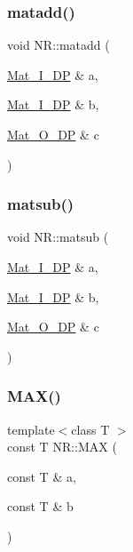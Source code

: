 \mbox{\label{namespaceNR_a3e83e821eb8a08def3eb745893d705f0}} 
\subsubsection{\texorpdfstring{matadd()}{matadd()}}
{\footnotesize\ttfamily void N\+R\+::matadd (\begin{DoxyParamCaption}\item[{\mbox{\hyperlink{namespaceNR_a2b8abfda8fffad6ba0a1b5a4c0773dbf}{Mat\+\_\+\+I\+\_\+\+DP}} \&}]{a,  }\item[{\mbox{\hyperlink{namespaceNR_a2b8abfda8fffad6ba0a1b5a4c0773dbf}{Mat\+\_\+\+I\+\_\+\+DP}} \&}]{b,  }\item[{\mbox{\hyperlink{namespaceNR_adc1f8da33094b6bbeb1f5f899515ce54}{Mat\+\_\+\+O\+\_\+\+DP}} \&}]{c }\end{DoxyParamCaption})}

\mbox{\label{namespaceNR_a3813813f04cdd8f245c3aa44ff4f445d}} 
\subsubsection{\texorpdfstring{matsub()}{matsub()}}
{\footnotesize\ttfamily void N\+R\+::matsub (\begin{DoxyParamCaption}\item[{\mbox{\hyperlink{namespaceNR_a2b8abfda8fffad6ba0a1b5a4c0773dbf}{Mat\+\_\+\+I\+\_\+\+DP}} \&}]{a,  }\item[{\mbox{\hyperlink{namespaceNR_a2b8abfda8fffad6ba0a1b5a4c0773dbf}{Mat\+\_\+\+I\+\_\+\+DP}} \&}]{b,  }\item[{\mbox{\hyperlink{namespaceNR_adc1f8da33094b6bbeb1f5f899515ce54}{Mat\+\_\+\+O\+\_\+\+DP}} \&}]{c }\end{DoxyParamCaption})}

\mbox{\label{namespaceNR_a92c68d40de4a9647ae9f24ec57c53b0e}} 
\subsubsection{\texorpdfstring{MAX()}{MAX()}\hspace{0.1cm}{\footnotesize\ttfamily [1/3]}}
{\footnotesize\ttfamily template$<$class T $>$ \\
const T N\+R\+::\+M\+AX (\begin{DoxyParamCaption}\item[{const T \&}]{a,  }\item[{const T \&}]{b }\end{DoxyParamCaption})\hspace{0.3cm}{\ttfamily [inline]}}

